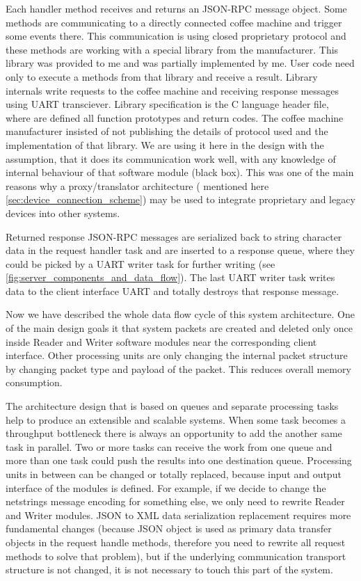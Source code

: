 Each handler method receives and returns an JSON-RPC message object. 
Some methods are communicating to a directly connected coffee machine and trigger some events there.
This communication is using closed proprietary protocol and these methods are working with a special library from the manufacturer.
This library was provided to me and was partially implemented by me.
User code need only to execute a methods from that library and receive a result.
Library internals write requests to the coffee machine and receiving response messages using UART transciever.
Library specification is the C language header file, where are defined all function prototypes and return codes. 
The coffee machine manufacturer insisted of not publishing the details of protocol used and the implementation of that library.
We are using it here in the design with the assumption, that it does its communication work well, with any knowledge of internal behaviour of that software module (black box).
This was one of the main reasons why a proxy/translator architecture ( mentioned here \ref{sec:device_connection_scheme}) may be used to integrate proprietary and legacy devices into other systems.

Returned response JSON-RPC messages are serialized back to string character data in the request handler task and are inserted to a response queue, where they could be picked by a UART writer task for further writing
(see \autoref{fig:server_components_and_data_flow}).
The last UART writer task writes data to the client interface UART and totally destroys that response message.

Now we have described the whole data flow cycle of this system architecture.
One of the main design goals it that system packets are created and deleted only once inside Reader and Writer software modules near the corresponding client interface.
Other processing units are only changing the internal packet structure by changing packet type and payload of the packet.
This reduces overall memory consumption.

The architecture design that is based on queues and separate processing tasks help to produce an extensible and scalable systems.
When some task becomes a throughput bottleneck there is always an opportunity to add the another same task in parallel. 
Two or more tasks can receive the work from one queue and more than one task could push the results into one destination queue.
Processing units in between can be changed or totally replaced, because input and output interface of the modules is defined.
For example, if we decide to change the netstrings message encoding for something else, we  only need to rewrite Reader and Writer modules.
JSON to XML data serialization replacement requires more fundamental changes (because JSON object is used as primary data transfer objects in the request handle methods, therefore you need to rewrite all request methods to solve that problem), but if the underlying communication transport structure is not changed, it is not necessary to touch this part of the system.


